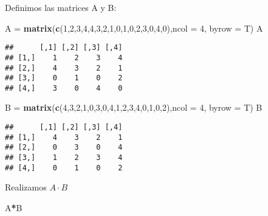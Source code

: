 \documentclass[
]{article}
\newenvironment{Shaded}{\begin{snugshade}}{\end{snugshade}}
\newcommand{\DataTypeTok}[1]{\textcolor[rgb]{0.13,0.29,0.53}{#1}}
\newcommand{\DecValTok}[1]{\textcolor[rgb]{0.00,0.00,0.81}{#1}}
\newcommand{\KeywordTok}[1]{\textcolor[rgb]{0.13,0.29,0.53}{\textbf{#1}}}
\newcommand{\NormalTok}[1]{#1}
\newcommand{\OperatorTok}[1]{\textcolor[rgb]{0.81,0.36,0.00}{\textbf{#1}}}
\newcommand{\StringTok}[1]{\textcolor[rgb]{0.31,0.60,0.02}{#1}}
\begin{document}
Definimos las matrices A y B:

\begin{Shaded}
\begin{Highlighting}[]
\NormalTok{A =}\StringTok{ }\KeywordTok{matrix}\NormalTok{(}\KeywordTok{c}\NormalTok{(}\DecValTok{1}\NormalTok{,}\DecValTok{2}\NormalTok{,}\DecValTok{3}\NormalTok{,}\DecValTok{4}\NormalTok{,}\DecValTok{4}\NormalTok{,}\DecValTok{3}\NormalTok{,}\DecValTok{2}\NormalTok{,}\DecValTok{1}\NormalTok{,}\DecValTok{0}\NormalTok{,}\DecValTok{1}\NormalTok{,}\DecValTok{0}\NormalTok{,}\DecValTok{2}\NormalTok{,}\DecValTok{3}\NormalTok{,}\DecValTok{0}\NormalTok{,}\DecValTok{4}\NormalTok{,}\DecValTok{0}\NormalTok{),}\DataTypeTok{ncol =} \DecValTok{4}\NormalTok{, }\DataTypeTok{byrow =}\NormalTok{ T)}
\NormalTok{A}
\end{Highlighting}
\end{Shaded}

\begin{verbatim}
##      [,1] [,2] [,3] [,4]
## [1,]    1    2    3    4
## [2,]    4    3    2    1
## [3,]    0    1    0    2
## [4,]    3    0    4    0
\end{verbatim}

\begin{Shaded}
\begin{Highlighting}[]
\NormalTok{B =}\StringTok{ }\KeywordTok{matrix}\NormalTok{(}\KeywordTok{c}\NormalTok{(}\DecValTok{4}\NormalTok{,}\DecValTok{3}\NormalTok{,}\DecValTok{2}\NormalTok{,}\DecValTok{1}\NormalTok{,}\DecValTok{0}\NormalTok{,}\DecValTok{3}\NormalTok{,}\DecValTok{0}\NormalTok{,}\DecValTok{4}\NormalTok{,}\DecValTok{1}\NormalTok{,}\DecValTok{2}\NormalTok{,}\DecValTok{3}\NormalTok{,}\DecValTok{4}\NormalTok{,}\DecValTok{0}\NormalTok{,}\DecValTok{1}\NormalTok{,}\DecValTok{0}\NormalTok{,}\DecValTok{2}\NormalTok{),}\DataTypeTok{ncol =} \DecValTok{4}\NormalTok{, }\DataTypeTok{byrow =}\NormalTok{ T)}
\NormalTok{B}
\end{Highlighting}
\end{Shaded}

\begin{verbatim}
##      [,1] [,2] [,3] [,4]
## [1,]    4    3    2    1
## [2,]    0    3    0    4
## [3,]    1    2    3    4
## [4,]    0    1    0    2
\end{verbatim}

Realizamos \(A\cdot B\)

\begin{Shaded}
\begin{Highlighting}[]
\NormalTok{A}\OperatorTok{*}\NormalTok{B}
\end{Highlighting}
\end{Shaded}
\end{document}
